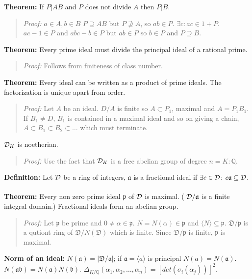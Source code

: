 {\bf Theorem:}
If $P|AB$ and $P$ does not divide $A$ then $P|B$.
\begin{quote}
\emph{Proof:} $a \in A, b \in B$ $P \supseteq AB$ but $P \nsupseteq A$,
so $ab \in P$.  $\exists c: ac \in 1 +P$.  $ac - 1 \in P$ and
$abc - b \in P$ but $ab \in P$ so $b \in P$ and $P \supseteq B$.
\end{quote}
{\bf Theorem:}
Every prime ideal must divide the principal ideal of a rational prime.
\begin{quote}
\emph{Proof:} Follows from finiteness of class number.
\end{quote}
{\bf Theorem:}
Every ideal can be written as a product of prime ideals.  The factorization
is unique apart from order.
\begin{quote}
\emph{Proof:} Let $A$ be an ideal.  $D/A$ is finite so $A \subset P_1$, maximal and
$A= P_1B_1$.  If $B_1 \neq D$, $B_1$ is contained in a maximal ideal and so on
giving a chain, $A \subset B_1 \subset B_2 \subset \ldots$ which must terminate.
\end{quote}
${\cal D}_K$ is noetherian.
\begin{quote}
\emph{Proof:} 
Use the fact that
${\cal D}_K$  is a free abelian group of degree $n= K:{\mathbb Q}$.
\end{quote}
{\bf Definition:}
Let ${\cal D}$ be a ring of integers, ${\mathfrak a}$
is a fractional ideal if $\exists c \in {\cal D}$: $c {\mathfrak a} \subseteq {\cal D}$.
\\
\\
{\bf Theorem:}
Every non zero prime ideal ${\mathfrak p}$ of ${\cal D}$ is maximal. (
${\cal D}/{\mathfrak a}$ is a finite integral domain.)  Fractional ideals form an abelian
group.  
\begin{quote}
\emph{Proof:} 
Let ${\mathfrak p}$ be prime and $0 \ne \alpha \in {\mathfrak p}$. $N = N(\alpha) \in {\mathfrak p}$
and $\langle N \rangle \subseteq {\mathfrak p}$.  ${\mathfrak D}/{\mathfrak p}$ is a
qutiont ring of ${\mathfrak D} / N({\mathfrak D})$ which is finite.  Since ${\mathfrak D}/{\mathfrak p}$
is finite, ${\mathfrak p}$ is maximal.
\end{quote}
{\bf Norm of an ideal:} 
$N({\mathfrak a})= |{\mathfrak D}/{\mathfrak a}|$; if ${\mathfrak a}= \langle a \rangle$ 
is principal
$N(a)= N({\mathfrak a})$. 
$N({\mathfrak a}{\mathfrak b})= N({\mathfrak a}) N({\mathfrak b})$.
$\Delta_{K/{\mathbb Q}}(\alpha_1 , \alpha_2, \ldots , \alpha_n )= 
[det(\sigma_i (\alpha_j))]^2$.
\\
\\
